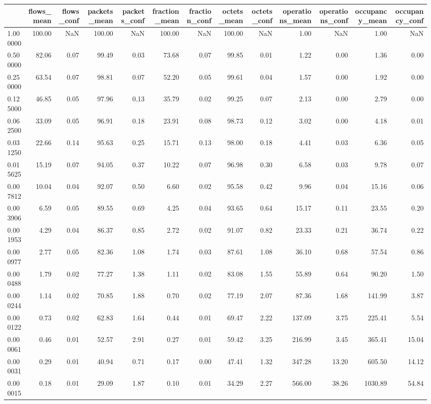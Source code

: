 \begin{tabular}{lrrrrrrrrrrrr}
\toprule
 & flows_mean & flows_conf & packets_mean & packets_conf & fraction_mean & fraction_conf & octets_mean & octets_conf & operations_mean & operations_conf & occupancy_mean & occupancy_conf \\
\midrule
1.000000 & 100.00 & NaN & 100.00 & NaN & 100.00 & NaN & 100.00 & NaN & 1.00 & NaN & 1.00 & NaN \\
0.500000 & 82.06 & 0.07 & 99.49 & 0.03 & 73.68 & 0.07 & 99.85 & 0.01 & 1.22 & 0.00 & 1.36 & 0.00 \\
0.250000 & 63.54 & 0.07 & 98.81 & 0.07 & 52.20 & 0.05 & 99.61 & 0.04 & 1.57 & 0.00 & 1.92 & 0.00 \\
0.125000 & 46.85 & 0.05 & 97.96 & 0.13 & 35.79 & 0.02 & 99.25 & 0.07 & 2.13 & 0.00 & 2.79 & 0.00 \\
0.062500 & 33.09 & 0.05 & 96.91 & 0.18 & 23.91 & 0.08 & 98.73 & 0.12 & 3.02 & 0.00 & 4.18 & 0.01 \\
0.031250 & 22.66 & 0.14 & 95.63 & 0.25 & 15.71 & 0.13 & 98.00 & 0.18 & 4.41 & 0.03 & 6.36 & 0.05 \\
0.015625 & 15.19 & 0.07 & 94.05 & 0.37 & 10.22 & 0.07 & 96.98 & 0.30 & 6.58 & 0.03 & 9.78 & 0.07 \\
0.007812 & 10.04 & 0.04 & 92.07 & 0.50 & 6.60 & 0.02 & 95.58 & 0.42 & 9.96 & 0.04 & 15.16 & 0.06 \\
0.003906 & 6.59 & 0.05 & 89.55 & 0.69 & 4.25 & 0.04 & 93.65 & 0.64 & 15.17 & 0.11 & 23.55 & 0.20 \\
0.001953 & 4.29 & 0.04 & 86.37 & 0.85 & 2.72 & 0.02 & 91.07 & 0.82 & 23.33 & 0.21 & 36.74 & 0.22 \\
0.000977 & 2.77 & 0.05 & 82.36 & 1.08 & 1.74 & 0.03 & 87.61 & 1.08 & 36.10 & 0.68 & 57.54 & 0.86 \\
0.000488 & 1.79 & 0.02 & 77.27 & 1.38 & 1.11 & 0.02 & 83.08 & 1.55 & 55.89 & 0.64 & 90.20 & 1.50 \\
0.000244 & 1.14 & 0.02 & 70.85 & 1.88 & 0.70 & 0.02 & 77.19 & 2.07 & 87.36 & 1.68 & 141.99 & 3.87 \\
0.000122 & 0.73 & 0.02 & 62.83 & 1.64 & 0.44 & 0.01 & 69.47 & 2.22 & 137.09 & 3.75 & 225.41 & 5.54 \\
0.000061 & 0.46 & 0.01 & 52.57 & 2.91 & 0.27 & 0.01 & 59.42 & 3.25 & 216.99 & 3.45 & 365.41 & 15.04 \\
0.000031 & 0.29 & 0.01 & 40.94 & 0.71 & 0.17 & 0.00 & 47.41 & 1.32 & 347.28 & 13.20 & 605.50 & 14.12 \\
0.000015 & 0.18 & 0.01 & 29.09 & 1.87 & 0.10 & 0.01 & 34.29 & 2.27 & 566.00 & 38.26 & 1030.89 & 54.84 \\

\end{tabular}

